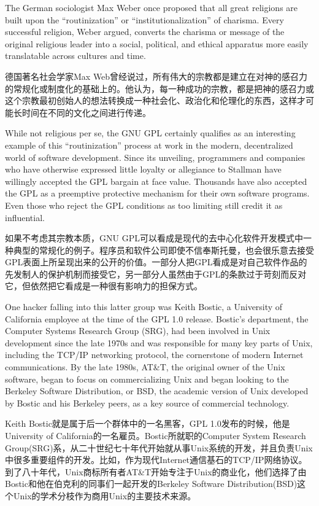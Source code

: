 \ifdefined\eng
The German sociologist Max Weber once proposed that all great religions are built upon the ``routinization'' or ``institutionalization'' of charisma. Every successful religion, Weber argued, converts the charisma or message of the original religious leader into a social, political, and ethical apparatus more easily translatable across cultures and time.
\fi

\ifdefined\chs
德国著名社会学家Max Web曾经说过，所有伟大的宗教都是建立在对神的感召力的常规化或制度化的基础上的。他认为，每一种成功的宗教，都是把神的感召力或这个宗教最初创始人的想法转换成一种社会化、政治化和伦理化的东西，这样才可能长时间在不同的文化之间进行传递。
\fi

\ifdefined\eng
While not religious per se, the GNU GPL certainly qualifies as an interesting example of this ``routinization'' process at work in the modern, decentralized world of software development. Since its unveiling, programmers and companies who have otherwise expressed little loyalty or allegiance to Stallman have willingly accepted the GPL bargain at face value. Thousands have also accepted the GPL as a preemptive protective mechanism for their own software programs. Even those who reject the GPL conditions as too limiting still credit it as influential.
\fi

\ifdefined\chs
如果不考虑其宗教本质，GNU GPL可以看成是现代的去中心化软件开发模式中一种典型的常规化的例子。程序员和软件公司即使不信奉斯托曼，也会很乐意去接受GPL表面上所呈现出来的公开的价值。一部分人把GPL看成是对自己软件作品的先发制人的保护机制而接受它，另一部分人虽然由于GPL的条款过于苛刻而反对它，但依然把它看成是一种很有影响力的担保方式。
\fi

\ifdefined\eng
One hacker falling into this latter group was Keith Bostic, a University of California employee at the time of the GPL 1.0 release. Bostic's department, the Computer Systems Research Group (SRG), had been involved in Unix development since the late 1970s and was responsible for many key parts of Unix, including the TCP/IP networking protocol, the cornerstone of modern Internet communications. By the late 1980s, AT\&T, the original owner of the Unix software, began to focus on commercializing Unix and began looking to the Berkeley Software Distribution, or BSD, the academic version of Unix developed by Bostic and his Berkeley peers, as a key source of commercial technology.
\fi

\ifdefined\chs
Keith Bostic就是属于后一个群体中的一名黑客，GPL 1.0发布的时候，他是University of California的一名雇员。Bostic所就职的Computer System Research Group(SRG)系，从二十世纪七十年代开始就从事Unix系统的开发，并且负责Unix中很多重要组件的开发。比如，作为现代Internet通信基石的TCP/IP网络协议。到了八十年代，Unix商标所有者AT\&T开始专注于Unix的商业化，他们选择了由Bostic和他在伯克利的同事们一起开发的Berkeley Software Distribution(BSD)这个Unix的学术分枝作为商用Unix的主要技术来源。
\fi

